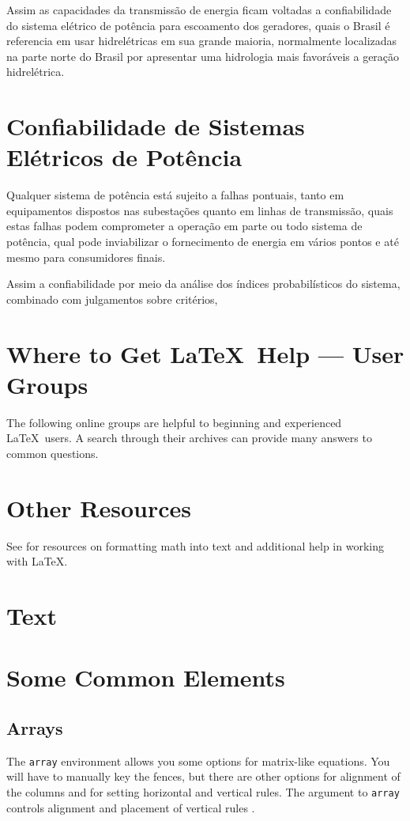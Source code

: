 \documentclass[lettersize,journal]{IEEEtran}
\begin{document}
Assim as capacidades da transmissão de energia ficam voltadas a confiabilidade do sistema elétrico de potência para escoamento dos geradores, quais o Brasil é referencia em usar hidrelétricas em sua grande maioria, normalmente localizadas na parte norte do Brasil por apresentar uma hidrologia mais favoráveis a geração hidrelétrica.


\section{Confiabilidade de Sistemas \\ Elétricos de Potência}

Qualquer sistema de potência está sujeito a falhas pontuais, tanto em equipamentos dispostos nas subestações quanto em linhas de transmissão, quais estas falhas podem comprometer a operação em parte ou todo sistema de potência, qual pode inviabilizar o fornecimento de energia em vários pontos e até mesmo para consumidores finais.

Assim a confiabilidade por meio da análise dos índices probabilísticos do sistema, combinado com julgamentos sobre critérios, 

\section{Where to Get \LaTeX \ Help --- User Groups}
The following online groups are helpful to beginning and experienced \LaTeX\ users. A search through their archives can provide many answers to common questions.

\section{Other Resources}
See for resources on formatting math into text and additional help in working with \LaTeX .

\section{Text}



\section{Some Common Elements}

\subsection{Arrays}
The {\tt{array}} environment allows you some options for matrix-like equations. You will have to manually key the fences, but there are other options for alignment of the columns and for setting horizontal and vertical rules. The argument to {\tt{array}} controls alignment and placement of vertical rules \cite{PIOTROWSKI2021} .
\end{document}
